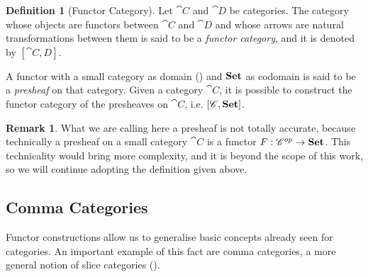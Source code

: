 \documentclass[a4paper, twoside,openright]{report}
\theoremstyle{plain}
\theoremstyle{definition}
\newtheorem{definition}[theorem]{Definition}
\newtheorem{remark}[theorem]{Remark}
\begin{document}
\begin{definition}[Functor Category]\label{def:functor_category}
    Let $\cat C$ and $\cat D$ be categories. The category whose objects are functors between $\cat C$ and $\cat D$ and whose arrows are natural transformations between them is said to be a \emph{functor category}, and it is denoted by $[\cat{C, D}]$.
\end{definition}

A functor with a small category as domain () and $\mathbf{Set}$ as codomain is said to be a \emph{presheaf} on that category. Given a category $\cat C$, it is possible to construct the functor category of the presheaves on $\cat C$, i.e. $[\mathscr{C}, \mathbf{Set}]$.

\begin{remark}
    What we are calling here a presheaf is not totally accurate, because technically a presheaf on a small category $\cat C$ is a functor $F: \mathscr{C} ^{op} \rightarrow \mathbf{Set}$. This technicality would bring more complexity, and it is beyond the scope of this work, so we will continue adopting the definition given above.
\end{remark}

\subsection{Comma Categories}

Functor constructions allow us to generalise basic concepts already seen for categories. An important example of this fact are comma categories, a more general notion of slice categories ().

\end{document}
